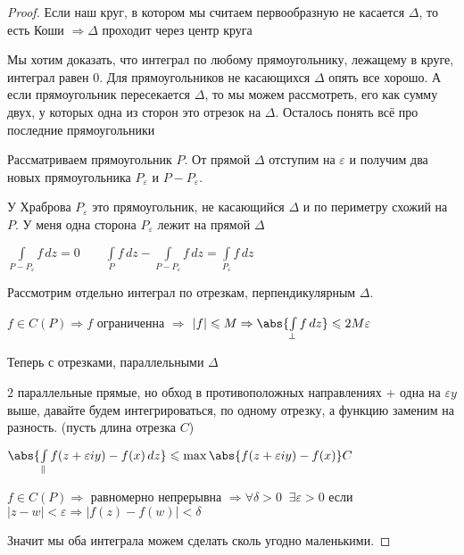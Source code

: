 \begin{proof}\thmslashn
	
	Если наш круг, в котором мы считаем первообразную не касается $\Delta$, то есть Коши $\Rightarrow \Delta$ проходит через центр круга
	 
	 Мы хотим доказать, что интеграл по любому прямоугольнику, лежащему в круге, интеграл равен 0. Для прямоугольников не касающихся $\Delta$ опять все хорошо. А если прямоугольник пересекается $\Delta$, то мы можем рассмотреть, его как сумму двух, у которых одна из сторон это отрезок на $\Delta$. Осталось понять всё про последние прямоугольники 
	 
	 Рассматриваем прямоугольник $P$. От прямой $\Delta$ отступим на $\varepsilon$ и получим два новых прямоугольника $P_\varepsilon$ и $P - P_\varepsilon$.
	 
	 \begin{remark_author}
	 	У Храброва $P_\varepsilon$ это прямоугольник, не касающийся $\Delta$ и по периметру схожий на $P$. У меня одна сторона $P_\varepsilon$ лежит на прямой $\Delta$
	 \end{remark_author}
	 
	 $\int\limits_{P - P_\varepsilon}f \,dz = 0 \qquad \int\limits_{P}f \,dz - \int\limits_{P - P_\varepsilon}f \,dz = \int\limits_{P_\varepsilon}f\,dz$
	 
	 Рассмотрим отдельно интеграл по отрезкам, перпендикулярным $\Delta$.
	  
	 $f\in C(P) \Rightarrow f$ ограниченна $\Rightarrow$ $|f| \leqslant M \Rightarrow \abs{\int\limits_{\perp} f\,dz} \leqslant 2M\varepsilon$ 
	 
	 Теперь с отрезками, параллельными $\Delta$
	 
	 2 параллельные прямые, но обход в противоположных направлениях + одна на $\varepsilon y$ выше, давайте будем интегрироваться, по одному отрезку, а функцию заменим на разность. (пусть длина отрезка $C$)
	 
	 $\abs{\int\limits_{\parallel}f(z + \varepsilon iy) - f(x)\,dz}  \leqslant \max \abs{f(z + \varepsilon iy) - f(x)} C$
	 
	 $f\in C(P) \Rightarrow$ равномерно непрерывна $\Rightarrow \forall \delta > 0 \;\; \exists \varepsilon > 0$ если $|z-w| < \varepsilon \Rightarrow |f(z) - f(w)| < \delta$ 
	
	Значит мы оба интеграла можем сделать сколь угодно маленькими.
	
\end{proof}


